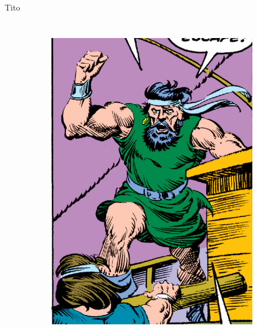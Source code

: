 \begin{frame}{Tito}
\begin{columns}
\begin{figure}[htp]
\begin{subfigure}[b]{0.23\textwidth}
				\includegraphics[width=\textwidth]{img/tito/CTB}
			\end{subfigure}
		\end{figure}
	\end{columns}
\end{frame}
\note[itemize]{
	\item
}


